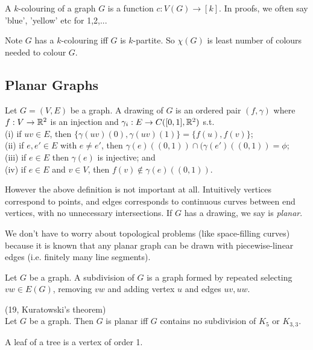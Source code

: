 \documentclass[a4paper]{article}
\begin{document}
\begin{defi}
A $k$-colouring of a graph $G$ is a function $c:V(G) \to [k]$. In proofs, we often say 'blue', 'yellow' etc for 1,2,...

Note $G$ has a $k$-colouring iff $G$ is $k$-partite. So $\chi(G)$ is least number of colours needed to colour $G$.
\end{defi}

\subsection{Planar Graphs}
\begin{defi}
Let $G = (V,E)$ be a graph. A drawing of $G$ is an ordered pair $(f,\gamma)$ where $f:V \to \mathbb{R}^2$ is an injection and $\gamma_i: E \to C([0,1],\mathbb{R}^2)$ s.t.\\
(i) if $uv \in E$, then $\{\gamma(uv)(0),\gamma(uv)(1)\} = \{f(u),f(v)\}$;\\
(ii) if $e,e' \in E$ with $e \neq e'$, then $\gamma(e) ((0,1)) \cap (\gamma(e') ((0,1)) = \phi$;\\
(iii) if $e \in E$ then $\gamma(e)$ is injective; and\\
(iv) if $e \in E$ and $v \in V$, then $f(v) \not\in \gamma(e) ((0,1))$.
\end{defi}

However the above definition is not important at all. Intuitively vertices correspond to points, and edges corresponds to continuous curves between end vertices, with no unnecessary intersections. If $G$ has a drawing, we say is \emph{planar}.

We don't have to worry about topological problems (like space-filling curves) because it is known that any planar graph can be drawn with piecewise-linear edges (i.e. finitely many line segments).

\begin{defi}
Let $G$ be a graph. A subdivision of $G$ is a graph formed by repeated selecting $vw \in E(G)$, removing $vw$ and adding vertex $u$ and edges $uv,uw$.
\end{defi}

\begin{thm} (19, Kuratowski's theorem)\\
Let $G$ be a graph. Then $G$ is planar iff $G$ contains no subdivision of $K_5$ or $K_{3,3}$.
\end{thm}

\begin{defi}
A leaf of a tree is a vertex of order 1.
\end{defi}
\end{document}
